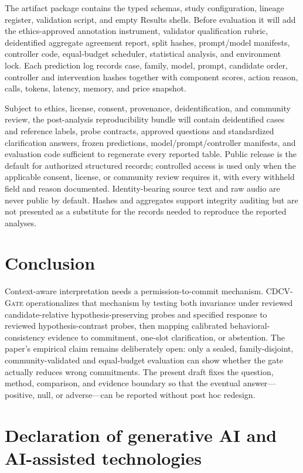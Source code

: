 \documentclass[preprint,12pt,authoryear]{elsarticle}
\newcommand{\cdcv}{\textsc{CDCV-Gate}}
\begin{document}
The artifact package contains the typed schemas, study configuration, lineage
register, validation script, and empty Results shells. Before evaluation it
will add the ethics-approved annotation instrument, validator qualification
rubric, deidentified aggregate agreement report, split hashes, prompt/model
manifests, controller code, equal-budget scheduler, statistical analysis, and
environment lock. Each prediction log records case, family, model, prompt,
candidate order, controller and intervention hashes together with component
scores, action reason, calls, tokens, latency, memory, and price snapshot.

Subject to ethics, license, consent, provenance, deidentification, and community
review, the post-analysis reproducibility bundle will contain deidentified
cases and reference labels, probe contracts, approved questions and
standardized clarification answers, frozen predictions, model/prompt/controller
manifests, and evaluation code sufficient to regenerate every reported table.
Public release is the default for authorized structured records; controlled
access is used only when the applicable consent, license, or community review
requires it, with every withheld field and reason documented. Identity-bearing
source text and raw audio are never public by default. Hashes and aggregates
support integrity auditing but are not presented as a substitute for the
records needed to reproduce the reported analyses.

\section{Conclusion}

Context-aware interpretation needs a permission-to-commit mechanism. \cdcv
operationalizes that mechanism by testing both invariance under reviewed
candidate-relative hypothesis-preserving probes and specified response to
reviewed hypothesis-contrast probes, then mapping calibrated behavioral-
consistency evidence to commitment, one-slot
clarification, or abstention. The paper's empirical claim remains deliberately
open: only a sealed, family-disjoint, community-validated and equal-budget
evaluation can show whether the gate actually reduces wrong commitments. The
present draft fixes the question, method, comparison, and evidence boundary so
that the eventual answer---positive, null, or adverse---can be reported without
post hoc redesign.

\section*{Declaration of generative AI and AI-assisted technologies}
\end{document}
